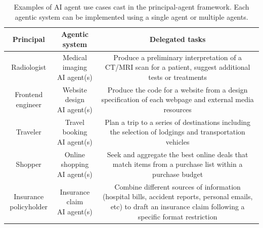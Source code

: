 \documentclass[11pt]{article}
\begin{document}
\begin{table}[]
    \centering
    \begin{tabular}{ccc}
    \toprule
    \textbf{Principal} & \textbf{Agentic system} & \textbf{Delegated tasks}  \\
    \midrule
    \multirow{2}{*}{Radiologist} & \multirow{2}{*}{\parbox{3.4cm}{\centering Medical imaging\\ AI agent(s)}} & \multirow{2}{*}{\parbox{8.5cm}{Produce a preliminary interpretation of a CT/MRI scan for a patient, suggest additional tests or treatments}} \\
    & & \\
    \midrule
    \multirow{2}{*}{\parbox{2.5cm}{\centering Frontend engineer}} & \multirow{2}{*}{\parbox{3.4cm}{\centering Website design\\ AI agent(s)}} & \multirow{2}{*}{\parbox{8.5cm}{Produce the code for a website from a design specification of each webpage and external media resources}} \\
    & & \\
    \midrule
    \multirow{2}{*}{Traveler} & \multirow{2}{*}{\parbox{3.4cm}{\centering Travel booking\\ AI agent(s)}} & \multirow{2}{*}{\parbox{8.5cm}{Plan a trip to a series of destinations including the selection of lodgings and transportation vehicles}}\\
    & & \\
    \midrule
    \multirow{2}{*}{Shopper} & \multirow{2}{*}{\parbox{3.4cm}{\centering Online shopping\\ AI agent(s)}} & \multirow{2}{*}{\parbox{8.5cm}{Seek and aggregate the best online deals that match items from a purchase list within a purchase budget}}\\
    & & \\
    \midrule
    \multirow{3}{*}{\parbox{2.5cm}{\centering Insurance\\ policyholder}} & \multirow{3}{*}{\parbox{3.4cm}{\centering Insurance claim\\ AI agent(s)}} & \multirow{3}{*}{\parbox{8.5cm}{Combine different sources of information (hospital bills, accident reports, personal emails, etc) to draft an insurance claim following a specific format restriction}}\\
    & & \\
    & & \\
    \bottomrule
    \end{tabular}
    \caption{Examples of AI agent use cases cast in the principal-agent framework. Each agentic system can be implemented using a single agent or multiple agents.}
    \label{tab:agent_cases}
    \vspace{-1em}
\end{table}
\end{document}

